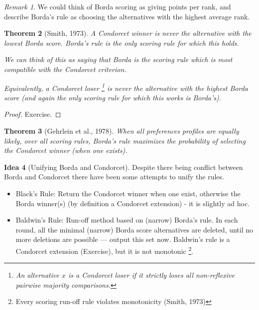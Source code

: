 \documentclass{book}
\theoremstyle{plain}
\newtheorem{theorem}{Theorem}[subsection]
\theoremstyle{definition}
\newtheorem{idea}[theorem]{Idea}
\theoremstyle{remark}
\newtheorem{remark}[theorem]{Remark}
\begin{document}
\begin{remark}
    We could think of Borda scoring as giving points per rank, 
    and describe Borda's rule as choosing the alternatives with the highest average rank.
\end{remark}

\begin{theorem}[Smith, 1973]
    A Condorcet winner is 
    never the alternative with the lowest Borda score.
    Borda's rule is the 
    only scoring rule for which this 
    holds.
    
    We can think of this as saying that 
    Borda is the scoring rule which is most compatible with 
    the Condorcet criterion.


    Equivalently, a Condorcet loser 
    \footnote{An alternative $x$ is a Condorcet loser if it strictly loses all non-reflexive pairwise majority comparisons.}
    is never the alternative with the 
    highest Borda score (and again the only scoring rule for which this works is Borda's).
\end{theorem}
\begin{proof}
    Exercise.
\end{proof}

\begin{theorem}[Gehrlein et al., 1978]
    When all preferences profiles are equally likely, 
    over all scoring rules, Borda's rule maximizes
    the probability of selecting the Condorcet winner (when one exists).
\end{theorem}

\begin{idea}[Unifying Borda and Condorcet]
    Despite there being conflict between 
    Borda and Condorcet there have been some attempts to unify the rules.
    \begin{itemize}
        \item Black's Rule: Return the Condorcet winner when 
        one exist, otherwise the Borda winner(s) (by definition a Condorcet extension)
        - it is slightly ad hoc.
        \item Baldwin's Rule:
        Run-off method based on (narrow) Borda's rule.
        In each round, all the minimal (narrow) Borda score alternatives are deleted, 
        until no more deletions are possible --- output this set now.
        Baldwin's rule is a Condorcet extension (Exercise), 
        but it is not monotonic
        \footnote{Every scoring run-off rule violates monotonicity (Smith, 1973)}.
    \end{itemize}
\end{idea}
\end{document}
